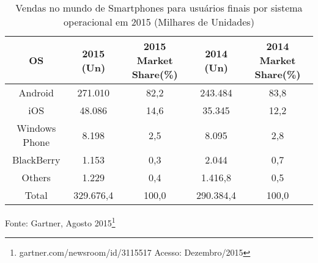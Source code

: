 \begin{table}[!htb]
	\label{tab:OS}
	\begin{tabular}{c|c|c|c|c}
		\hline \SPACE
		\textbf{OS} & \textbf{2015 (Un)}  & \textbf{2015 Market Share(\%)}  & \textbf{2014 (Un)}  & \textbf{2014 Market Share(\%)} \\ \hline \SPACE
		Android & 271.010 & 82,2 & 243.484 & 83,8\\ \hline \SPACE
		iOS & 48.086 & 14,6 & 35.345 & 12,2\\ \hline \SPACE
		Windows Phone & 8.198 & 2,5 & 8.095 & 2,8\\ \hline \SPACE
		BlackBerry & 1.153 & 0,3 & 2.044 & 0,7\\ \hline \SPACE
		Others & 1.229 & 0,4 & 1.416,8 & 0,5\\ \hline \SPACE
		Total & 329.676,4 & 100,0 & 290.384,4 & 100,0\\
		\hline
	\end{tabular}
	\caption[Sistemas operacionais mais utilizados]{Vendas no mundo de Smartphones para usuários finais por sistema operacional em 2015 (Milhares de Unidades)}
\end{table}%
\begin{center}
	\small
	{Fonte: Gartner, Agosto 2015\footnote{gartner.com/newsroom/id/3115517 Acesso: Dezembro/2015}}
\end{center}